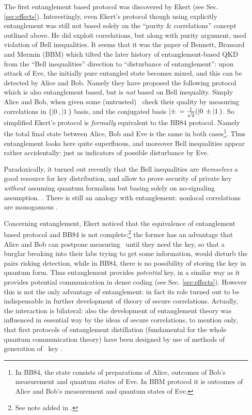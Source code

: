 \documentclass[twocolumn,aps,rmp]{revtex4}
\begin{document}
The first entanglement based protocol was discovered by Ekert (see
Sec. \ref{sec:effects}). Interestingly, even Ekert's protocol though
using explicitly entanglement was still not based solely on the
``purity \& correlations'' concept outlined above. He did exploit
correlations, but along with purity argument, used violation of Bell
inequalities. It seems that it was the paper of Bennett, Brassard and
Mermin (BBM) \cite{BBM92} which tilted the later history of
entanglement-based QKD from the ``Bell inequalities'' direction to
``disturbance of entanglement'': upon attack of Eve, the
initially pure entangled state becomes mixed, and this can be detected
by Alice and Bob. Namely they have proposed the following protocol
which is also entanglement based, but is {\it not} based on Bell
inequality. Simply Alice and Bob, when given some (untrusted)
\eprpairs\ check their quality by measuring correlations in
$\{|0\>,|1\>\}$ basis, and the conjugated basis
$|\pm\>={1\over \sqrt2}(|0\>\pm|1\>)$. So
simplified Ekert's protocol is {\it formally} equivalent to the BB84
protocol. Namely the total final state between Alice, Bob and Eve is
the same in both cases\footnote{In BB84, the state consists of
  preparations of Alice, outcomes of Bob's measurement and quantum
  states of Eve. In BBM protocol it is outcomes of Alice and Bob's
  measurement and quantum states of Eve.}. Thus entanglement looks
here quite superfluous, and moreover Bell inequalities appear rather
accidentally: just as indicators of possible disturbance by Eve.

Paradoxically, it turned out recently that the Bell inequalities are
{\it themselves} a good resource for key distribution, and allow to
prove security of private key {\it without} assuming quantum formalism
but basing solely on no-signaling
assumption. \cite{AcinGM-bellqkd,BHK_Bell_key,MW_Bellcrypto}. There is
still an analogy with entanglement: nonlocal correlations are
monogamous \cite{BKP_Bellcrypto}.

Concerning entanglement, Ekert noticed that the equivalence of
entanglement based protocol and BB84 is not complete:\footnote{See
  note added in \cite{BBM92}.} the former has an advantage that Alice
and Bob can postpone measuring \eprpairs\ until they need the key, so
that a burglar breaking into their labs trying to get some
information, would disturb the pairs risking detection, while in BB84,
there is no possibility of storing the key in quantum form.  Thus
entanglement provides {\it potential} key, in a similar way as it
provides potential communication in dense coding (see Sec.
\ref{sec:effects}). However this is not the only advantage of
entanglement: in fact its role turned out to be
indispensable in further development of theory of secure
correlations. Actually, the interaction is bilateral: also the development
of entanglement theory was influenced in essential way by the ideas of
secure correlations, to mention only, that first protocols of
entanglement distillation (fundamental for the whole quantum
communication theory) have been designed by use of methods of
generation of \secure\ key \cite{BBPSSW1996,BDSW1996}.
\end{document}
